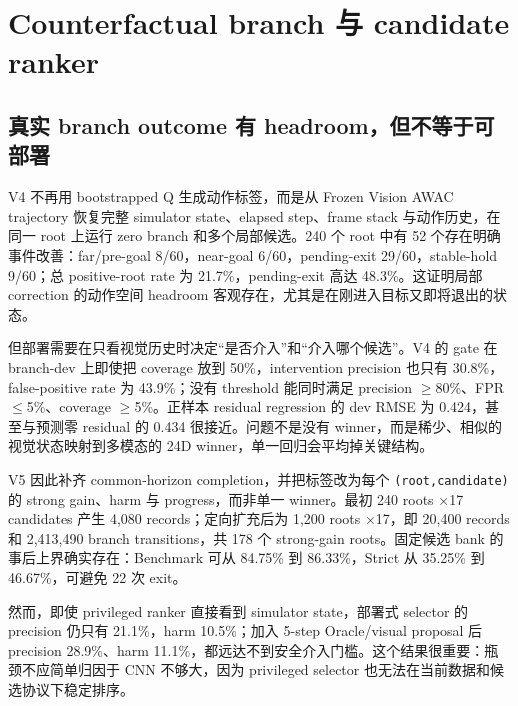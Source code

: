 \hypertarget{counterfactual-branch-ux4e0e-candidate-ranker}{%
\section{Counterfactual branch 与 candidate ranker}\label{counterfactual-branch-ux4e0e-candidate-ranker}}

\hypertarget{ux771fux5b9e-branch-outcome-ux6709-headroomux4f46ux4e0dux7b49ux4e8eux53efux90e8ux7f72}{%
\subsection{真实 branch outcome 有 headroom，但不等于可部署}\label{ux771fux5b9e-branch-outcome-ux6709-headroomux4f46ux4e0dux7b49ux4e8eux53efux90e8ux7f72}}

V4 不再用 bootstrapped Q 生成动作标签，而是从 Frozen Vision AWAC trajectory 恢复完整 simulator state、elapsed step、frame stack 与动作历史，在同一 root 上运行 zero branch 和多个局部候选。240 个 root 中有 52 个存在明确事件改善：far/pre-goal 8/60，near-goal 6/60，pending-exit 29/60，stable-hold 9/60；总 positive-root rate 为 21.7\%，pending-exit 高达 48.3\%。这证明局部 correction 的动作空间 headroom 客观存在，尤其是在刚进入目标又即将退出的状态。

但部署需要在只看视觉历史时决定``是否介入''和``介入哪个候选''。V4 的 gate 在 branch-dev 上即使把 coverage 放到 50\%，intervention precision 也只有 30.8\%，false-positive rate 为 43.9\%；没有 threshold 能同时满足 precision \(\geq\)80\%、FPR \(\leq\)5\%、coverage \(\geq\)5\%。正样本 residual regression 的 dev RMSE 为 0.424，甚至与预测零 residual 的 0.434 很接近。问题不是没有 winner，而是稀少、相似的视觉状态映射到多模态的 24D winner，单一回归会平均掉关键结构。

V5 因此补齐 common-horizon completion，并把标签改为每个 \texttt{(root,candidate)} 的 strong gain、harm 与 progress，而非单一 winner。最初 240 roots ×17 candidates 产生 4,080 records；定向扩充后为 1,200 roots ×17，即 20,400 records 和 2,413,490 branch transitions，共 178 个 strong-gain roots。固定候选 bank 的事后上界确实存在：Benchmark 可从 84.75\% 到 86.33\%，Strict 从 35.25\% 到 46.67\%，可避免 22 次 exit。

然而，即使 privileged ranker 直接看到 simulator state，部署式 selector 的 precision 仍只有 21.1\%，harm 10.5\%；加入 5-step Oracle/visual proposal 后 precision 28.9\%、harm 11.1\%，都远达不到安全介入门槛。这个结果很重要：瓶颈不应简单归因于 CNN 不够大，因为 privileged selector 也无法在当前数据和候选协议下稳定排序。

